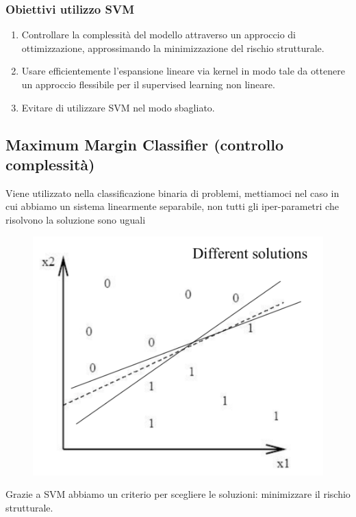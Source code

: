 \documentclass{article}
\begin{document}
\subsubsection{Obiettivi utilizzo SVM}
\begin{enumerate}
    \item Controllare la complessità del modello attraverso un approccio di ottimizzazione, approssimando la minimizzazione del rischio strutturale.
    \item Usare efficientemente l'espansione lineare via kernel in modo tale da ottenere un approccio flessibile per il supervised learning non lineare.
    \item Evitare di utilizzare SVM nel modo sbagliato.
\end{enumerate}
\clearpage

\subsection{Maximum Margin Classifier (controllo complessità)}
Viene utilizzato nella classificazione binaria di problemi, mettiamoci nel caso in cui abbiamo un sistema linearmente separabile, non tutti gli iper-parametri che risolvono la soluzione sono uguali
\begin{figure}[H]
\centering
\includegraphics[scale=0.4]{Images/svmmultiplesolution.png}
\end{figure}
Grazie a SVM abbiamo un criterio per scegliere le soluzioni: minimizzare il rischio strutturale.
\end{document}
